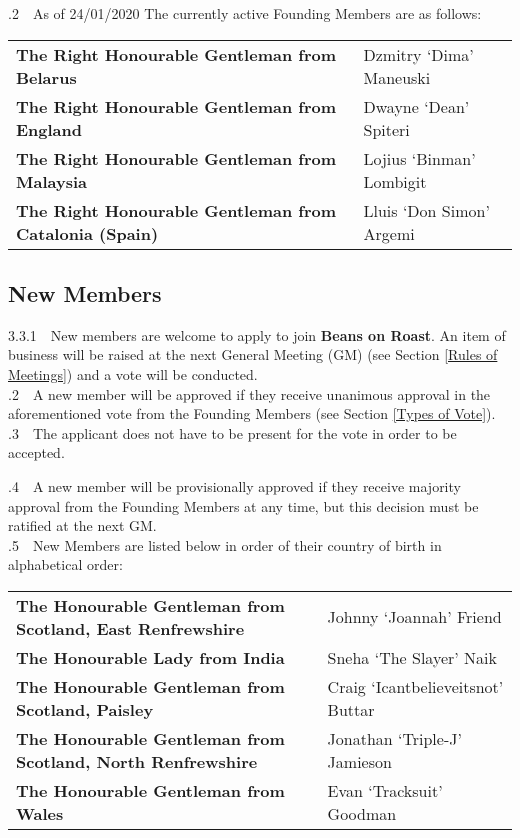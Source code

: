 \documentclass[a4paper,11pt]{article}
\begin{document}
.2$\quad$As of 24/01/2020 The currently active Founding Members are as follows: 

\begin{table}[h!]
\begin{tabular}{ll}
\textbf{The Right Honourable Gentleman from  Belarus} & Dzmitry `Dima'  Maneuski \\
\textbf{The Right Honourable Gentleman from England} & Dwayne `Dean' Spiteri \\
\textbf{The Right Honourable Gentleman from Malaysia} & Lojius `Binman' Lombigit \\
\textbf{The Right Honourable Gentleman from Catalonia (Spain)} & Lluis `Don Simon' Argemi \\
\end{tabular}
\end{table}

\subsection{New Members}
\label{New Members}
3.3.1$\quad$New members are welcome to apply to join \textbf{Beans on Roast}. An item of business will be raised at the next General Meeting (GM) (see Section \ref{Rules of Meetings}) and a vote will be conducted.\\ 

.2$\quad$A new member will be approved if they receive unanimous approval in the aforementioned vote from the Founding Members (see Section \ref{Types of Vote}). \\

.3$\quad$The applicant does not have to be present for the vote in order to be accepted. 

.4$\quad$A new member will be provisionally approved if they receive majority approval from the Founding Members at any time, but this decision must be ratified at the next GM. \\

.5$\quad$New Members are listed below in order of their country of birth in alphabetical order: 
\begin{table}[h!]
\begin{tabular}{ll}
\textbf{The Honourable Gentleman from  Scotland, East Renfrewshire} & Johnny `Joannah' Friend \\
\textbf{The Honourable Lady from India} & Sneha `The Slayer' Naik \\
\textbf{The Honourable Gentleman from Scotland, Paisley} & Craig `Icantbelieveitsnot' Buttar\\
\textbf{The Honourable Gentleman from Scotland, North Renfrewshire} & Jonathan `Triple-J' Jamieson\\
\textbf{The Honourable Gentleman from Wales} & Evan `Tracksuit' Goodman
\end{tabular}
\end{table}
\end{document}

